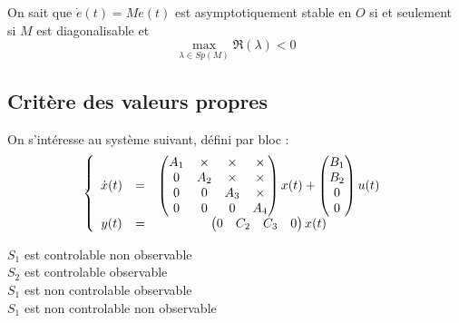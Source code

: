 On sait que $\dot{e}(t)=Me(t)$ est asymptotiquement stable en $O$ si et seulement si $M$ est diagonalisable et \[\max_{\lambda\in Sp(M)} \Re(\lambda)<0\]


\subsection{Critère des valeurs propres}
On s'intéresse au système suivant, défini par bloc :
\[\left\{ \begin{array}{c c c}
\dot{x}(t)&=&\begin{pmatrix} A_1 & \times & \times & \times \\ 0 & A_2 & \times & \times \\ 0 & 0 & A_3 & \times \\ 0 & 0 & 0 & A_4 \end{pmatrix} x(t) + \begin{pmatrix} B_1 \\ B_2 \\ 0 \\ 0 \end{pmatrix} u(t) \\
y(t)&=&\begin{pmatrix} 0 & C_2 & C_3 & 0 \end{pmatrix} x(t)
\end{array}\right.\]

\begin{minipage}{0.4\linewidth}
\end{minipage}\hspace{0.1\linewidth}
\begin{minipage}{0.4\linewidth}
$S_1$ est controlable non observable\\
$S_2$ est controlable observable\\
$S_1$ est non controlable observable\\
$S_1$ est non controlable non observable\\
\end{minipage}

